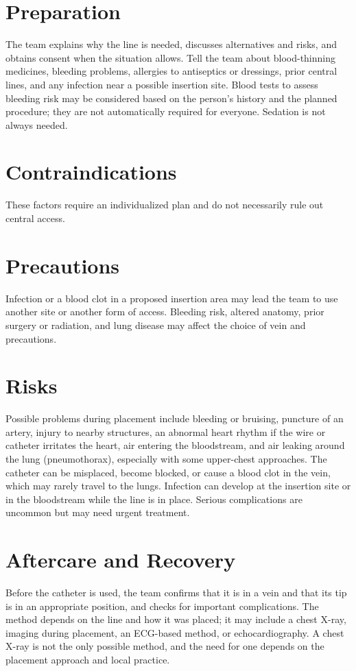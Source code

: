 \section*{Preparation}
The team explains why the line is needed, discusses alternatives and risks, and obtains consent when the situation allows. Tell the team about blood-thinning medicines, bleeding problems, allergies to antiseptics or dressings, prior central lines, and any infection near a possible insertion site. Blood tests to assess bleeding risk may be considered based on the person's history and the planned procedure; they are not automatically required for everyone. Sedation is not always needed.

\section*{Contraindications}
These factors require an individualized plan and do not necessarily rule out central access.

\section*{Precautions}
Infection or a blood clot in a proposed insertion area may lead the team to use another site or another form of access. Bleeding risk, altered anatomy, prior surgery or radiation, and lung disease may affect the choice of vein and precautions.

\section*{Risks}
Possible problems during placement include bleeding or bruising, puncture of an artery, injury to nearby structures, an abnormal heart rhythm if the wire or catheter irritates the heart, air entering the bloodstream, and air leaking around the lung (pneumothorax), especially with some upper-chest approaches. The catheter can be misplaced, become blocked, or cause a blood clot in the vein, which may rarely travel to the lungs. Infection can develop at the insertion site or in the bloodstream while the line is in place. Serious complications are uncommon but may need urgent treatment.

\section*{Aftercare and Recovery}
Before the catheter is used, the team confirms that it is in a vein and that its tip is in an appropriate position, and checks for important complications. The method depends on the line and how it was placed; it may include a chest X-ray, imaging during placement, an ECG-based method, or echocardiography. A chest X-ray is not the only possible method, and the need for one depends on the placement approach and local practice.

